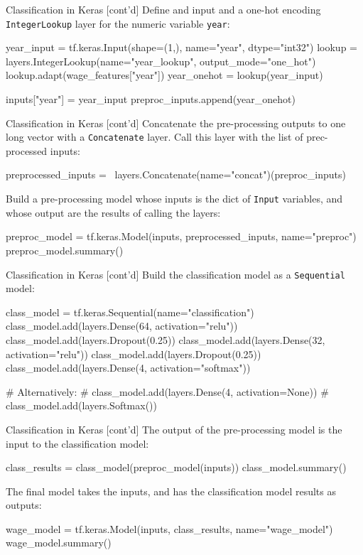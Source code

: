 \documentclass[ignorenonframetext,xcolor=x11names]{beamer}
\begin{document}
\begin{frame}[fragile]{Classification in Keras \small [cont'd]}
Define and input and a one-hot encoding \texttt{IntegerLookup} layer for the numeric variable \texttt{year}:
\begin{pythoncode}
year_input = tf.keras.Input(shape=(1,), 
                           name="year", 
                           dtype="int32")
lookup = layers.IntegerLookup(name="year_lookup",
                              output_mode="one_hot")
lookup.adapt(wage_features["year"])
year_onehot = lookup(year_input)

inputs["year"] = year_input
preproc_inputs.append(year_onehot)
\end{pythoncode}
\end{frame}

\begin{frame}[fragile]{Classification in Keras \small [cont'd]}
Concatenate the pre-processing outputs to one long vector with a \texttt{Concatenate} layer. Call this layer with the list of prec-processed inputs:
\begin{pythoncode}
preprocessed_inputs = \
    layers.Concatenate(name="concat")(preproc_inputs)
\end{pythoncode}
Build a pre-processing model whose inputs is the dict of \texttt{Input} variables, and whose output are the results of calling the layers:
\begin{pythoncode}
preproc_model = tf.keras.Model(inputs, 
                               preprocessed_inputs,
                               name="preproc")
preproc_model.summary()
\end{pythoncode}
\end{frame}

\begin{frame}[fragile]{Classification in Keras \small [cont'd]}
Build the classification model as a \texttt{Sequential} model:
\begin{pythoncode}
class_model = tf.keras.Sequential(name="classification")
class_model.add(layers.Dense(64, activation="relu"))
class_model.add(layers.Dropout(0.25))
class_model.add(layers.Dense(32, activation="relu"))
class_model.add(layers.Dropout(0.25))
class_model.add(layers.Dense(4, activation="softmax"))

# Alternatively:
# class_model.add(layers.Dense(4, activation=None))
# class_model.add(layers.Softmax())
\end{pythoncode}
\end{frame}

\begin{frame}[fragile]{Classification in Keras \small [cont'd]}
The output of the pre-processing model is the input to the classification model:
\begin{pythoncode}
class_results = class_model(preproc_model(inputs))
class_model.summary()
\end{pythoncode}
The final model takes the inputs, and has the classification model results as outputs:
\begin{pythoncode}
wage_model = tf.keras.Model(inputs, class_results,
                            name="wage_model")
wage_model.summary()
\end{pythoncode}
\end{frame}
\end{document}
